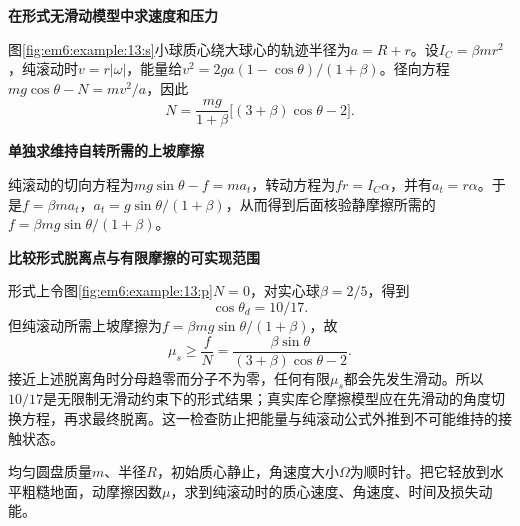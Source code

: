 \begin{solution}\textbf{在形式无滑动模型中求速度和压力}\par\nobreak
图\ref{fig:em6:example:13:s}小球质心绕大球心的轨迹半径为$a=R+r$。设$I_C=\beta mr^2$，纯滚动时$v=r|\omega|$，能量给$v^2=2ga(1-\cos\theta)/(1+\beta)$。径向方程$mg\cos\theta-N=mv^2/a$，因此
\[N=\frac{mg}{1+\beta}\bigl[(3+\beta)\cos\theta-2\bigr].\]



\par\medskip{}\noindent\textbf{单独求维持自转所需的上坡摩擦}\par\nobreak
纯滚动的切向方程为$mg\sin\theta-f=ma_t$，转动方程为$fr=I_C\alpha$，并有$a_t=r\alpha$。于是$f=\beta ma_t$，$a_t=g\sin\theta/(1+\beta)$，从而得到后面核验静摩擦所需的$f=\beta mg\sin\theta/(1+\beta)$。



\par\medskip{}\noindent\textbf{比较形式脱离点与有限摩擦的可实现范围}\par\nobreak
形式上令图\ref{fig:em6:example:13:p}$N=0$，对实心球$\beta=2/5$，得到
\[\boxed{\cos\theta_d=10/17}.\]
但纯滚动所需上坡摩擦为$f=\beta mg\sin\theta/(1+\beta)$，故
\[\mu_s\ge\frac{f}{N}=\frac{\beta\sin\theta}{(3+\beta)\cos\theta-2}.\]
接近上述脱离角时分母趋零而分子不为零，任何有限$\mu_s$都会先发生滑动。所以$10/17$是无限制无滑动约束下的形式结果；真实库仑摩擦模型应在先滑动的角度切换方程，再求最终脱离。这一检查防止把能量与纯滚动公式外推到不可能维持的接触状态。\end{solution}
\begin{question}\begin{example}[自转圆盘落到粗糙地面]\label{em6:example:14}
均匀圆盘质量$m$、半径$R$，初始质心静止，角速度大小$\Omega$为顺时针。把它轻放到水平粗糙地面，动摩擦因数$\mu$，求到纯滚动时的质心速度、角速度、时间及损失动能。
\end{example}
\end{question}
